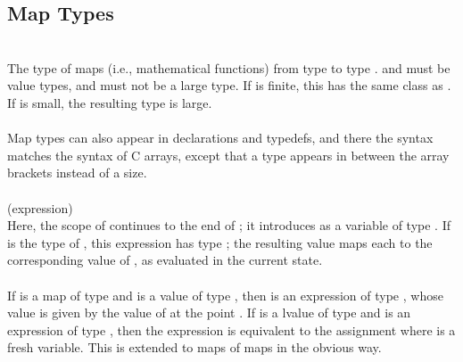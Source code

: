 \documentclass[preprint,nocopyrightspace]{sigplanconf}
\begin{document}
{{\subsection{Map Types}
\\
The type of maps (i.e., mathematical functions) from type  to type . 
 and  must be value types, and  must
not be a large type. If  is finite, this has the same class
as . If  is small, the resulting type is large.
\\\\
Map types can also appear in
declarations and typedefs, and there the syntax matches the syntax of
C arrays, except that a type appears in between the
array brackets instead of a size.
\\\\
 (expression)\\
Here, the scope of  continues to the end of ; it
introduces  as a variable of type . 
If  is the
type of , this expression has type ; the resulting
value maps each  to the corresponding value of , as
evaluated in the current state.
\\\\
If  is a map of
type  and  is a value of type ,
then  is an expression of type , whose value is
given by the value of  at the point . If  is a
lvalue of type  and  is an expression of
type , then the expression  is equivalent to
the assignment 
where  is a fresh variable. This is extended to maps of maps in
the obvious way.

}}
\end{document}

